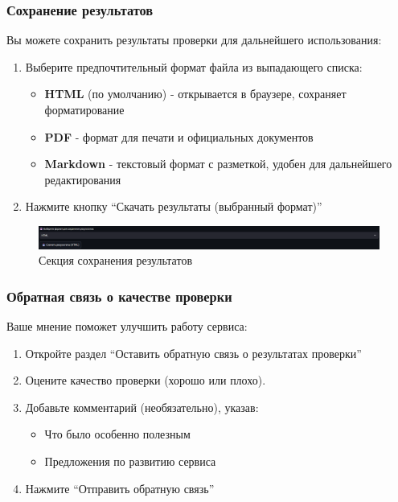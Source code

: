 \documentclass[a4paper,12pt]{article}
\begin{document}
\FloatBarrier
\begin{samepage}
\subsubsection{Сохранение результатов}
Вы можете сохранить результаты проверки для дальнейшего использования:

\begin{enumerate}
    \item Выберите предпочтительный формат файла из выпадающего списка:
    \begin{itemize}
        \item \textbf{HTML} (по умолчанию) - открывается в браузере, сохраняет форматирование
        \item \textbf{PDF} - формат для печати и официальных документов
        \item \textbf{Markdown} - текстовый формат с разметкой, удобен для дальнейшего редактирования
    \end{itemize}

    \item Нажмите кнопку ``Скачать результаты (выбранный формат)''
\end{enumerate}
\end{samepage}

\begin{figure}[!htb]
    \centering
    \includegraphics[width=\linewidth]{assets/save_results.png}
    \caption{Секция сохранения результатов}
\end{figure}

\FloatBarrier
\begin{samepage}
\subsubsection{Обратная связь о качестве проверки}
Ваше мнение поможет улучшить работу сервиса:

\begin{enumerate}
    \item Откройте раздел ``Оставить обратную связь о результатах проверки''
    \item Оцените качество проверки (хорошо или плохо).
    \item Добавьте комментарий (необязательно), указав:
    \begin{itemize}
        \item Что было особенно полезным
        \item Предложения по развитию сервиса
    \end{itemize}
    \item Нажмите ``Отправить обратную связь''
\end{enumerate}
\end{samepage}
\end{document}
